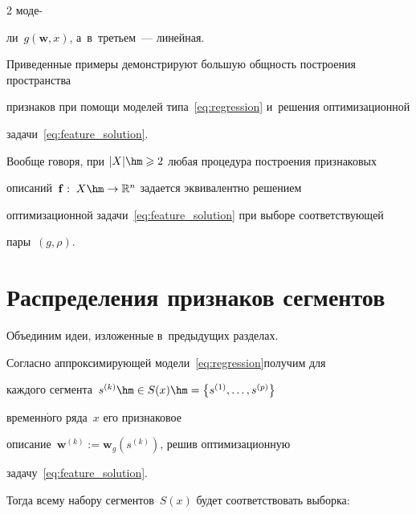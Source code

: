 \begin{multicols}{2}
моде-\linebreak\vspace*{-12pt}





\columnbreak





\noindent


ли~$g(\mathbf{w},x)$, а~в~третьем~--- линейная.


Приведенные примеры демонстрируют большую общность построения пространства 


признаков при помощи моделей типа~\eqref{eq:regression} и~решения оптимизационной\linebreak 


задачи~\eqref{eq:feature_solution}.


Вообще говоря, при $|X|\hm\geqslant 2$ любая процедура построения признаковых 


описаний~$\mathbf{f}:\;X\hm\to \mathbb{R}^n$ задается эквивалентно решением 


оптимизационной задачи~\eqref{eq:feature_solution} при выборе соответствующей 


пары~$(g,\rho)$.





\section{Распределения признаков сегментов}







Объединим идеи, изложенные в~предыдущих разделах.


Согласно аппроксимирующей модели~\eqref{eq:regression}\linebreak получим для 


каж\-до\-го сегмента~$s^{(k)}\hm\in S(x)\hm=\left\{s^{(1)},\ldots,s^{(p)}\right\}$ 


временн$\acute{\mbox{о}}$го ряда~$x$ его признаковое 


описание~$\mathbf{w}^{(k)}:=\mathbf{w}_g(s^{(k)})$, решив оптимизационную 


задачу~\eqref{eq:feature_solution}.


Тогда всему набору \mbox{сегментов}~$S(x)$ будет соответствовать выборка:


\begin{equation}



\end{equation}
\end{multicols}
